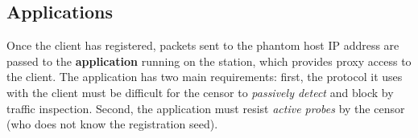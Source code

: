 \documentclass[sigconf]{acmart}
\newcommand{\note}[2]{\hl{[\textbf{#1:} #2]}\xspace}
\newcommand{\nikita}[1]{\note{nikita}{#1}}
\begin{document}




\subsection{Applications}


Once the client has registered, packets sent to the phantom host IP address are
passed to the \textbf{application} running on the station, which provides
proxy access to the client. The application has
two main requirements: first, the protocol it uses with the client 
must be difficult for the censor to \emph{passively detect} and block by traffic
inspection. Second, the application must resist \emph{active probes} by the censor (who
does not know the registration seed).
\end{document}
